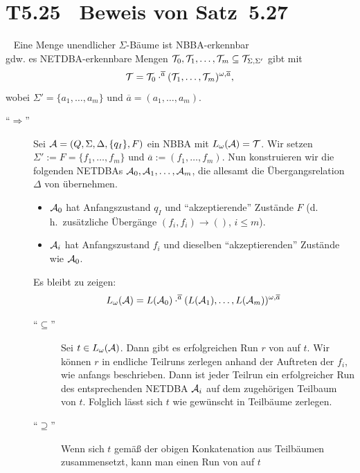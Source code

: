 \documentclass[fontsize=11pt, twoside=false, numbers=autoenddot]{scrbook}
\begin{document}
\section*{T5.25~ Beweis von Satz~5.27}

~
Eine Menge \Tmc unendlicher $\Sigma$-Bäume ist NBBA-erkennbar \\
gdw. es NETDBA-erkennbare Mengen $\mathcal{T}_0,\mathcal{T}_1,\dots,\mathcal{T}_m \subseteq \mathcal{T}_{\Sigma,\Sigma'}$ gibt mit
\[
  \mathcal{T} = \mathcal{T}_0 \cdot^{\overline{a}} (\mathcal{T}_1,\dots,\mathcal{T}_m)^{\omega,\overline{a}},
\]
wobei $\Sigma' = \{a_1,\dots,a_m\}$ und $\overline{a} = (a_1,\dots,a_m)$.

\parII
{}
%
\begin{description}
  \item[{\boldmath "`$\Rightarrow$"'}]
    Sei $\mathcal{A} = (Q,\Sigma,\Delta,\{q_I\},F)$ ein NBBA mit $L_\omega(\mathcal{A}) = \mathcal{T}$.
    Wir setzen $\Sigma' := F = \{f_1,\dots,f_m\}$ und $\overline{a} := (f_1,\dots,f_m)$.
    Nun konstruieren wir die folgenden NETDBAs $\mathcal{A}_0,\mathcal{A}_1,\dots,\mathcal{A}_m$,
    die allesamt die Übergangsrelation $\Delta$ von \Amc übernehmen.
    \begin{itemize}
      \item 
        $\mathcal{A}_0$ hat Anfangszustand $q_I$
        und "`akzeptierende"' Zustände $F$ (d.\,h.\ zusätzliche Übergänge $(f_i,f_i) \to ()$, $i \leq m$).
      \item
        $\mathcal{A}_i$ hat Anfangszustand $f_i$ und dieselben "`akzeptierenden"' Zustände wie $\mathcal{A}_0$.
    \end{itemize}
    Es bleibt zu zeigen:
    \[
      L_\omega(\mathcal{A}) = L(\mathcal{A}_0) \cdot^{\overline{a}} (L(\mathcal{A}_1),\dots,L(\mathcal{A}_m))^{\omega,\overline{a}}
    \]
    \begin{description}
      \item[{\boldmath "`$\subseteq$"'}] 
        Sei $t \in L_\omega(\mathcal{A})$. Dann gibt es erfolgreichen Run $r$ von \Amc auf $t$.
        Wir können $r$ in endliche Teilruns zerlegen anhand der Auftreten der $f_i$,
        wie anfangs beschrieben.
        Dann ist jeder Teilrun ein erfolgreicher Run des entsprechenden NETDBA $\mathcal{A}_i$
        auf dem zugehörigen Teilbaum von $t$.
        Folglich lässt sich $t$ wie gewünscht in Teilbäume zerlegen.
      \item[{\boldmath "`$\supseteq$"'}] 
        Wenn sich $t$ gemäß der obigen Konkatenation aus Teilbäumen zusammensetzt,
        kann man einen Run von \Amc auf $t$

\end{description}
\end{description}
\end{document}
